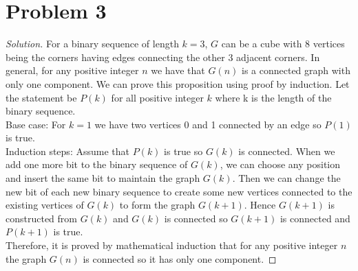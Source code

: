 \documentclass[12pt]{article}
\newenvironment{solution}{\begin{proof}[Solution]}{\end{proof}}
\begin{document}
\section*{Problem 3}
\begin{solution}
    For a binary sequence of length \(k=3\), \(G\) can be a cube with 8 vertices
    being the corners having edges connecting the other 3 adjacent corners. In
    general, for any positive integer \(n\) we have that \(G(n)\) is a connected
    graph with only one component. We can prove this proposition using proof by
    induction. Let the statement be \(P(k)\) for all positive integer \(k\)
    where k is the length of the binary sequence. \\
    Base case: For \(k=1\) we have two vertices 0 and 1 connected by an edge so
    \(P(1)\) is true. \\
    Induction steps: Assume that \(P(k)\) is true so \(G(k)\) is connected.
    When we add one more bit to the binary sequence of \(G(k)\), we can choose
    any position and insert the same bit to maintain the graph \(G(k)\). Then
    we can change the new bit of each new binary sequence to create some new
    vertices connected to the existing vertices of \(G(k)\) to form the graph
    \(G(k+1)\). Hence \(G(k+1)\) is constructed from \(G(k)\) and \(G(k)\) is
    connected so \(G(k+1)\) is connected and \(P(k+1)\) is true. \\
    Therefore, it is proved by mathematical induction that for any positive
    integer \(n\) the graph \(G(n)\) is connected so it has only one component.
\end{solution}
\end{document}
